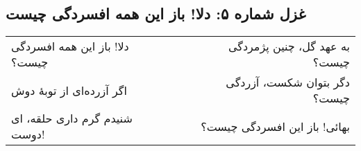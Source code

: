 \begin{center}
\section*{غزل شماره ۵: دلا! باز این همه افسردگی چیست}
\label{sec:005}
\begin{longtable}{l p{0.5cm} r}
دلا! باز این همه افسردگی چیست؟
&&
به عهد گل، چنین پژمردگی چیست؟
\\
اگر آزرده‌ای از توبهٔ دوش
&&
دگر بتوان شکست، آزردگی چیست؟
\\
شنیدم گرم داری حلقه، ای دوست!
&&
بهائی! باز این افسردگی چیست؟
\\
\end{longtable}
\end{center}
